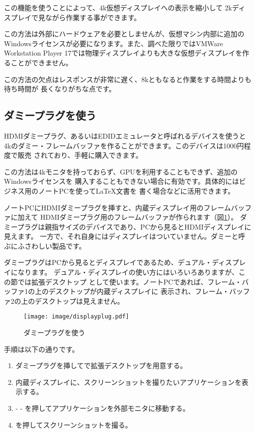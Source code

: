 この機能を使うことによって、4k仮想ディスプレイへの表示を縮小して
2kディスプレイで見ながら作業する事ができます。

この方法は外部にハードウェアを必要としませんが、仮想マシン内部に追加の
Windowsライセンスが必要になります。また、調べた限りではVMWare Workstation
Player 17では物理ディスプレイよりも大きな仮想ディスプレイを作ることができません。

この方法の欠点はレスポンスが非常に遅く、8kともなると作業をする時間よりも待ち時間が
長くなりがちな点です。


\subsection{ダミープラグを使う}
HDMIダミープラグ、あるいはEDIDエミュレータと呼ばれるデバイスを使うと
4kのダミー・フレームバッファを作ることができます。このデバイスは1000円程度で販売
されており、手軽に購入できます。

この方法は4kモニタを持っておらず、GPUを利用することもできず、追加のWindowsライセンスを
購入することもできない場合に有効です。具体的にはビジネス用のノートPCを使って\LaTeX 文書を
書く場合などに活用できます。

ノートPCにHDMIダミープラグを挿すと、内蔵ディスプレイ用のフレームバッファに加えて
HDMIダミープラグ用のフレームバッファが作られます（図\ref{fig:display-plug}）。
ダミープラグは親指サイズのデバイスであり、PCから見るとHDMIディスプレイに見えます。
一方で、それ自身にはディスプレイはついていません。ダミーと呼ぶにふさわしい製品です。

ダミープラグはPCから見るとディスプレイであるため、デュアル・ディスプレイになります。
デュアル・ディスプレイの使い方にはいろいろありますが、この節では拡張デスクトップ
として使います。ノートPCであれば、フレーム・バッファ1の上のデスクトップが内蔵ディスプレイに
表示され、フレーム・バッファ2の上のデスクトップは見えません。


\begin{figure}[btp]
  \begin{center}
    \texttt{[image: image/displayplug.pdf]}
    \caption{ダミープラグを使う} \label{fig:display-plug}
  \end{center}
\end{figure}



手順は以下の通りです。

\begin{enumerate}
  \item ダミープラグを挿してで拡張デスクトップを用意する。
  \item 内蔵ディスプレイに、スクリーンショットを撮りたいアプリケーションを表示する。
  \item {} -  - を押してアプリケーションを外部モニタに移動する。
  \item {}を押してスクリーンショットを撮る。
\end{enumerate}


